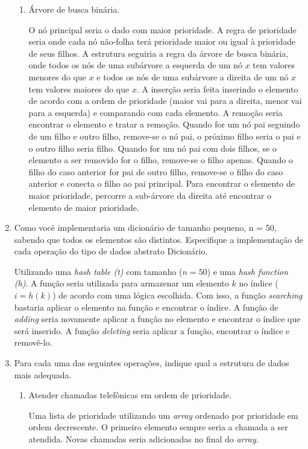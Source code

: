 \documentclass[12pt,a4paper]{article}
\begin{document}
\begin{enumerate}
\begin{enumerate}
		\item Árvore de busca binária.
		
		O nó principal seria o dado com maior prioridade. A regra de prioridade seria onde cada nó não-folha terá prioridade maior ou igual à prioridade de seus filhos. A estrutura seguiria a regra da árvore de busca binária, onde todos os nós de uma subárvore a esquerda de um nó $x$ tem valores menores do que $x$ e todos os nós de uma subárvore a direita de um nó $x$ tem valores maiores do que $x$. A inserção seria feita inserindo o elemento de acordo com a ordem de prioridade (maior vai para a direita, menor vai para a esquerda) e comparando com cada elemento. A remoção seria encontrar o elemento e tratar a remoção. Quando for um nó pai seguindo de um filho e outro filho, remove-se o nó pai, o próximo filho seria o pai e o outro filho seria filho. Quando for um nó pai com dois filhos, se o elemento a ser removido for o filho, remove-se o filho apenas. Quando o filho do caso anterior for pai de outro filho, remove-se o filho do caso anterior e conecta o filho ao pai principal. Para encontrar o elemento de maior prioridade, percorre a sub-árvore da direita até encontrar o elemento de maior prioridade.	
	\end{enumerate}


	\item Como você implementaria um dicionário de tamanho pequeno, n = 50, sabendo que todos os elementos são distintos. Especifique a implementação de cada operação do tipo de dados abstrato Dicionário.
	
	Utilizando uma \textit{hash table (t)} com tamanho ($n=50$) e uma \textit{hash function (h)}. A função seria utilizada para armazenar um elemento $k$ no índice ($i=h(k)$) de acordo com uma lógica escolhida. Com isso, a função \textit{searching} bastaria aplicar o elemento na função e encontrar o índice. A função de \textit{adding} seria novamente aplicar a função no elemento e encontrar o índice que será inserido. A função \textit{deleting} seria aplicar a função, encontrar o índice e removê-lo.	
	
	
	\item Para cada uma das seguintes operações, indique qual a estrutura de dados mais adequada.
	\begin{enumerate}
		\item Atender chamadas telefônicas em ordem de prioridade.
		
		Uma lista de prioridade utilizando um \textit{array} ordenado por prioridade em ordem decrescente. O primeiro elemento sempre seria a chamada a ser atendida. Novas chamadas seria adicionadas no final do \textit{array}.
		

\end{enumerate}
\end{enumerate}
\end{document}
